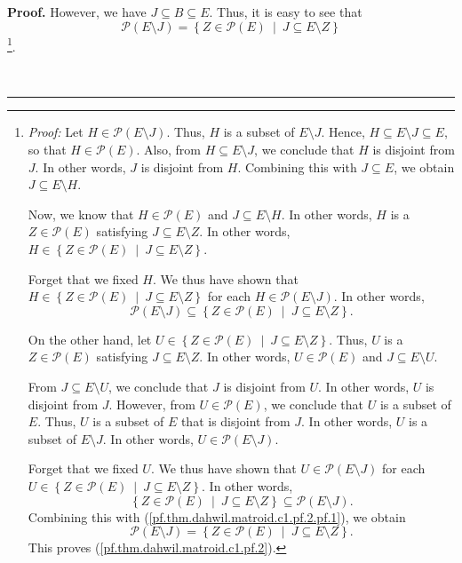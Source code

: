 \documentclass[numbers=enddot,12pt,final,onecolumn,notitlepage]{scrartcl}%
\theoremstyle{definition}
\newenvironment{proof}[1][Proof]{\noindent\textbf{#1.} }{\ \rule{0.5em}{0.5em}}
\newenvironment{verlong}{}{}
\begin{document}
\begin{verlong}
\begin{proof}
However, we have $J\subseteq B\subseteq E$. Thus, it is easy to see that
\begin{equation}
\mathcal{P}\left(  E\setminus J\right)  =\left\{  Z\in\mathcal{P}\left(
E\right)  \ \mid\ J\subseteq E\setminus Z\right\}
\label{pf.thm.dahwil.matroid.c1.pf.2}%
\end{equation}
\footnote{\textit{Proof:} Let $H\in\mathcal{P}\left(  E\setminus J\right)  $.
Thus, $H$ is a subset of $E\setminus J$. Hence, $H\subseteq E\setminus
J\subseteq E$, so that $H\in\mathcal{P}\left(  E\right)  $. Also, from
$H\subseteq E\setminus J$, we conclude that $H$ is disjoint from $J$. In other
words, $J$ is disjoint from $H$. Combining this with $J\subseteq E$, we obtain
$J\subseteq E\setminus H$.
\par
Now, we know that $H\in\mathcal{P}\left(  E\right)  $ and $J\subseteq
E\setminus H$. In other words, $H$ is a $Z\in\mathcal{P}\left(  E\right)  $
satisfying $J\subseteq E\setminus Z$. In other words, $H\in\left\{
Z\in\mathcal{P}\left(  E\right)  \ \mid\ J\subseteq E\setminus Z\right\}  $.
\par
Forget that we fixed $H$. We thus have shown that $H\in\left\{  Z\in
\mathcal{P}\left(  E\right)  \ \mid\ J\subseteq E\setminus Z\right\}  $ for
each $H\in\mathcal{P}\left(  E\setminus J\right)  $. In other words,%
\begin{equation}
\mathcal{P}\left(  E\setminus J\right)  \subseteq\left\{  Z\in\mathcal{P}%
\left(  E\right)  \ \mid\ J\subseteq E\setminus Z\right\}  .
\label{pf.thm.dahwil.matroid.c1.pf.2.pf.1}%
\end{equation}
\par
On the other hand, let $U\in\left\{  Z\in\mathcal{P}\left(  E\right)
\ \mid\ J\subseteq E\setminus Z\right\}  $. Thus, $U$ is a $Z\in
\mathcal{P}\left(  E\right)  $ satisfying $J\subseteq E\setminus Z$. In other
words, $U\in\mathcal{P}\left(  E\right)  $ and $J\subseteq E\setminus U$.
\par
From $J\subseteq E\setminus U$, we conclude that $J$ is disjoint from $U$. In
other words, $U$ is disjoint from $J$. However, from $U\in\mathcal{P}\left(
E\right)  $, we conclude that $U$ is a subset of $E$. Thus, $U$ is a subset of
$E$ that is disjoint from $J$. In other words, $U$ is a subset of $E\setminus
J$. In other words, $U\in\mathcal{P}\left(  E\setminus J\right)  $.
\par
Forget that we fixed $U$. We thus have shown that $U\in\mathcal{P}\left(
E\setminus J\right)  $ for each $U\in\left\{  Z\in\mathcal{P}\left(  E\right)
\ \mid\ J\subseteq E\setminus Z\right\}  $. In other words,%
\[
\left\{  Z\in\mathcal{P}\left(  E\right)  \ \mid\ J\subseteq E\setminus
Z\right\}  \subseteq\mathcal{P}\left(  E\setminus J\right)  .
\]
Combining this with (\ref{pf.thm.dahwil.matroid.c1.pf.2.pf.1}), we obtain
\[
\mathcal{P}\left(  E\setminus J\right)  =\left\{  Z\in\mathcal{P}\left(
E\right)  \ \mid\ J\subseteq E\setminus Z\right\}  .
\]
This proves (\ref{pf.thm.dahwil.matroid.c1.pf.2}).}.


\end{proof}
\end{verlong}
\end{document}
